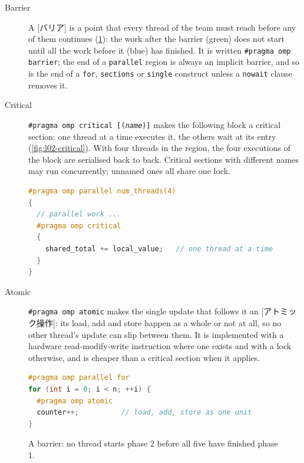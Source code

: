 \documentclass[../main.tex]{subfiles}
\begin{document}
\begin{description}
  \item[Barrier]  A [バリア] is a point that every thread
    of the team must reach before any of them continues
    (\cref{fig:l02-barrier}): the work after the barrier (green) does not
    start until all the work before it (blue) has finished.  It is written
    \texttt{\#pragma omp barrier}; the end of a \texttt{parallel} region
    is always an implicit barrier, and so is the end of a \texttt{for},
    \texttt{sections} or \texttt{single} construct unless a
    \texttt{nowait} clause removes it.
  \item[Critical]  \texttt{\#pragma omp critical [(\textit{name})]} makes
    the following block a critical section: one thread at a time executes
    it, the others wait at its entry (\cref{fig:l02-critical}).  With four
    threads in the region, the four executions of the block are
    serialised back to back.  Critical sections with different names may
    run concurrently; unnamed ones all share one lock.
\begin{lstlisting}[language=C++, numbers=none]
#pragma omp parallel num_threads(4)
{
  // parallel work ...
  #pragma omp critical
  {
    shared_total += local_value;   // one thread at a time
  }
}
\end{lstlisting}
  \item[Atomic]  \texttt{\#pragma omp atomic} makes the single update
    that follows it an [アトミック操作]: its load,
    add and store happen as a whole or not at all, so no other thread's
    update can slip between them.  It is implemented with a hardware
    read-modify-write instruction where one exists and with a lock
    otherwise, and is cheaper than a critical section when it
    applies.
\begin{lstlisting}[language=C++, numbers=none]
#pragma omp parallel for
for (int i = 0; i < n; ++i) {
  #pragma omp atomic
  counter++;          // load, add, store as one unit
}
\end{lstlisting}
\end{description}

\begin{figure}[tb]
  \centering
  
  \caption{A barrier: no thread starts phase 2 before all five have
    finished phase 1.}
  \label{fig:l02-barrier}
\end{figure}
\end{document}
